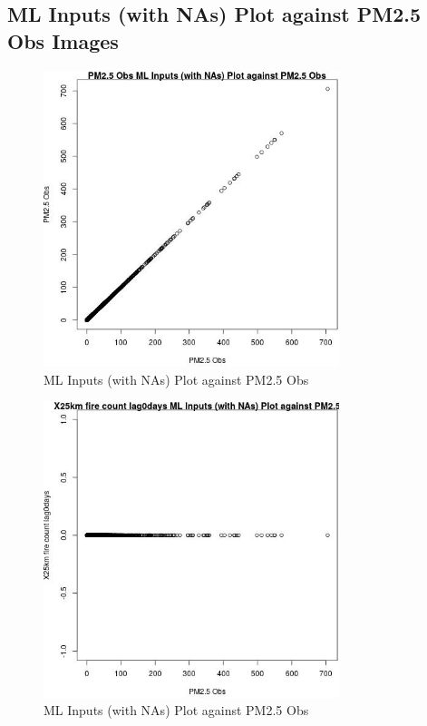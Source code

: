 
\subsection{ML Inputs (with NAs) Plot against PM2.5 Obs Images} 
 

\begin{figure} 
\centering  
\includegraphics[width=0.77\textwidth]{Code_Outputs/Report_ML_input_PM25_Step4_part_e_de_duplicated_aves_compiled_2019-05-14wNAs_PM25_ObsvPM25_Obs.jpg} 
\caption{\label{fig:Report_ML_input_PM25_Step4_part_e_de_duplicated_aves_compiled_2019-05-14wNAsPM25_ObsvPM25_Obs}ML Inputs (with NAs) Plot against PM2.5 Obs} 
\end{figure} 
 

\begin{figure} 
\centering  
\includegraphics[width=0.77\textwidth]{Code_Outputs/Report_ML_input_PM25_Step4_part_e_de_duplicated_aves_compiled_2019-05-14wNAs_X25km_fire_count_lag0daysvPM25_Obs.jpg} 
\caption{\label{fig:Report_ML_input_PM25_Step4_part_e_de_duplicated_aves_compiled_2019-05-14wNAsX25km_fire_count_lag0daysvPM25_Obs}ML Inputs (with NAs) Plot against PM2.5 Obs} 
\end{figure} 
 

